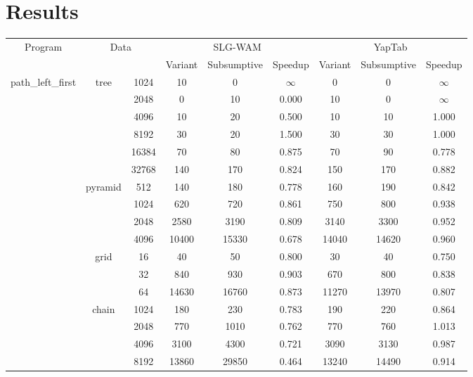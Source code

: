\section{Results}

\begin{table}[ht]
\scriptsize{
\begin{tabular}{c|c|c|c|c|c|c|c|c}
   \hline
   \multirow{2}{*}{Program} & \multicolumn{2}{c|}{\multirow{2}{*}{Data}} & \multicolumn{3}{c|}{SLG-WAM} & \multicolumn{3}{c}{YapTab} \\ \cline{4-6} \cline{7-9}
   & \multicolumn{2}{c|}{} & Variant & Subsumptive & Speedup & Variant & Subsumptive & Speedup \\ \hline
   
   \multirow{20}{*}{path\_left\_first} &  \multirow{6}{*}{tree} &  1024 &  10 & 0 &  $\infty$  & 0 & 0 &  $\infty$ \\
   &  &  2048 &  0 & 10 &  0.000  & 10 & 0 &  $\infty$ \\
   &  &  4096 &  10 & 20 &  0.500  & 10 & 10 &  1.000 \\
   &  &  8192 &  30 & 20 &  1.500  & 30 & 30 &  1.000 \\
   &  &  16384 &  70 & 80 &  0.875  & 70 & 90 &  0.778 \\
   &  &  32768 &  140 & 170 &  0.824  & 150 & 170 &  0.882 \\
   \cline{2-9}
   &  \multirow{4}{*}{pyramid} &  512 &  140 & 180 &  0.778  & 160 & 190 &  0.842 \\
   &  &  1024 &  620 & 720 &  0.861  & 750 & 800 &  0.938 \\
   &  &  2048 &  2580 & 3190 &  0.809  & 3140 & 3300 &  0.952 \\
   &  &  4096 &  10400 & 15330 &  0.678  & 14040 & 14620 &  0.960 \\
   \cline{2-9}
   &  \multirow{3}{*}{grid} &  16 &  40 & 50 &  0.800  & 30 & 40 &  0.750 \\
   &  &  32 &  840 & 930 &  0.903  & 670 & 800 &  0.838 \\
   &  &  64 &  14630 & 16760 &  0.873  & 11270 & 13970 &  0.807 \\
   \cline{2-9}
   &  \multirow{4}{*}{chain} &  1024 &  180 & 230 &  0.783  & 190 & 220 &  0.864 \\
   &  &  2048 &  770 & 1010 &  0.762  & 770 & 760 &  1.013 \\
   &  &  4096 &  3100 & 4300 &  0.721  & 3090 & 3130 &  0.987 \\
   &  &  8192 &  13860 & 29850 &  0.464  & 13240 & 14490 &  0.914 \\

\end{tabular}}
\end{table}

